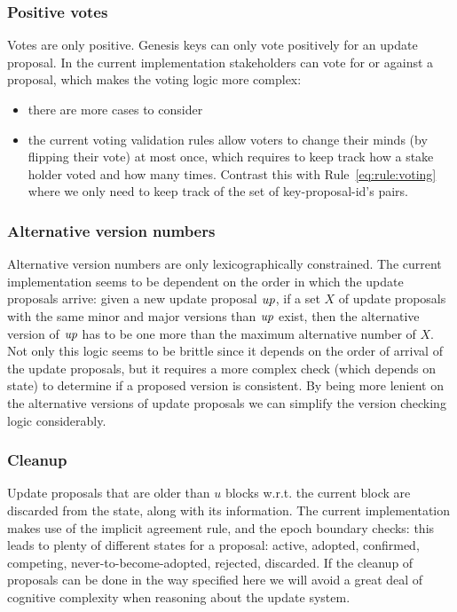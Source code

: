 \subsubsection{Positive votes}
\label{sec:only-positive-votes}

Votes are only positive. Genesis keys can only vote positively for an update
proposal. In the current implementation stakeholders can vote for or against a
proposal, which makes the voting logic more complex:
\begin{itemize}
\item there are more cases to consider
\item the current voting validation rules allow voters to change their minds
  (by flipping their vote) at most once, which requires to keep track how a
  stake holder voted and how many times. Contrast this with
  Rule~\ref{eq:rule:voting} where we only need to keep track of the set of
  key-proposal-id's pairs.
\end{itemize}

\subsubsection{Alternative version numbers}
\label{sec:alt-version-numbers-constraints}

Alternative version numbers are only lexicographically constrained. The current
implementation seems to be dependent on the order in which the update proposals
arrive: given a new update proposal $\mathit{up}$, if a set $X$ of update
proposals with the same minor and major versions than $\mathit{up}$ exist, then
the alternative version of $\mathit{up}$ has to be one more than the maximum
alternative number of $X$. Not only this logic seems to be brittle since it
depends on the order of arrival of the update proposals, but it requires a more
complex check (which depends on state) to determine if a proposed version is
consistent. By being more lenient on the alternative versions of update
proposals we can simplify the version checking logic considerably.

\subsubsection{Cleanup}
\label{sec:up-cleanup}

Update proposals that are older than $u$ blocks w.r.t. the current block are
discarded from the state, along with its information. The current
implementation makes use of the implicit agreement rule, and the epoch boundary
checks: this leads to plenty of different states for a proposal: active,
adopted, confirmed, competing, never-to-become-adopted, rejected, discarded. If
the cleanup of proposals can be done in the way specified here we will avoid a
great deal of cognitive complexity when reasoning about the update system.

